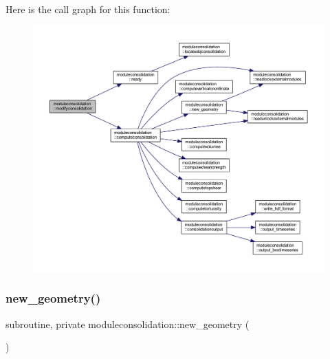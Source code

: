Here is the call graph for this function\+:\nopagebreak
\begin{figure}[H]
\begin{center}
\leavevmode
\includegraphics[width=350pt]{namespacemoduleconsolidation_a0143c8577e56dbbb86e0db4d5927c316_cgraph}
\end{center}
\end{figure}
\mbox{\label{namespacemoduleconsolidation_a1642d306f23b2cafb2dc89dde15f6e67}} 
\subsubsection{\texorpdfstring{new\+\_\+geometry()}{new\_geometry()}}
{\footnotesize\ttfamily subroutine, private moduleconsolidation\+::new\+\_\+geometry (\begin{DoxyParamCaption}{ }\end{DoxyParamCaption})\hspace{0.3cm}{\ttfamily [private]}}

